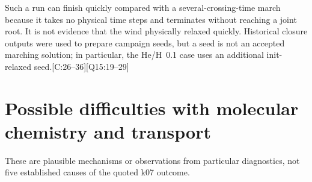 \documentclass[english,a4paper]{my_memo}
\newcommand{\ev}[2]{\textnormal{\small[#1:#2]}}
\begin{document}
Such a run can finish quickly compared with a several-crossing-time march
because it takes no physical time steps and terminates without reaching a
joint root. It is not evidence that the wind physically relaxed quickly.
Historical closure outputs were used to prepare campaign seeds, but a seed
is not an accepted marching solution; in particular, the He/H~0.1 case uses
an additional init-relaxed seed.\ev{C}{26--36}\ev{Q15}{19--29}

\section{Possible difficulties with molecular chemistry and transport}\label{sec:difficulties}

These are plausible mechanisms or observations from particular diagnostics,
not five established causes of the quoted k07 outcome.
\end{document}
